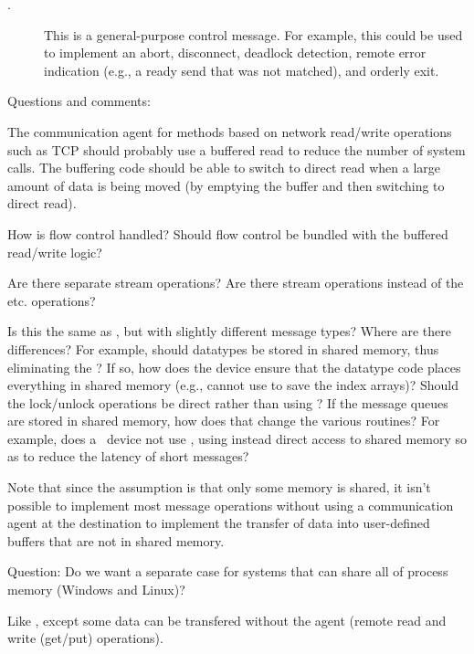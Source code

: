 \documentclass{article}
\begin{document}
\begin{tcp}
\begin{description}
\item[.]This is a general-purpose control
message.  For example, this could be used to implement an abort,
disconnect, deadlock detection, remote error indication (e.g., a ready
send that was not matched), and orderly exit.
\end{description}

Questions and comments:

The communication agent for methods based on network read/write
operations such as TCP should probably use a buffered read to reduce
the number of system 
calls.  The buffering code should be able to switch to direct read when a
large amount of data is being moved (by emptying the buffer and then switching
to direct read).  

How is flow control handled?  Should flow control be bundled with the buffered
read/write logic?

Are there separate stream operations?  Are there stream operations
instead of the  etc. operations?
\end{tcp}

\begin{shmem}
Is this the same as \tcpname, but with slightly different message
types?
Where are there differences?  For example, should datatypes be stored
in shared memory, thus eliminating the
?  If so, how does the device ensure
that the datatype code places everything in shared memory (e.g.,
 cannot use  to save the
index arrays)?  Should the lock/unlock operations
be direct rather than using ?
If the message queues are stored in shared memory, how does that
change the various routines?  For example, does a \shmemname\ device not
use , using instead direct access to shared
memory so as to reduce the latency of short messages?

Note that since the assumption is that only some memory is shared, it
isn't possible to implement most message operations without using a
communication agent at the destination to implement the transfer of
data into user-defined buffers that are not in shared memory.

Question:  Do we want a separate case for systems that can share all
of process memory (Windows and Linux)?
\end{shmem}

\begin{via}
Like \tcpname, except some data can be transfered without the agent
(remote read and write (get/put) operations).
\end{via}
\end{document}
